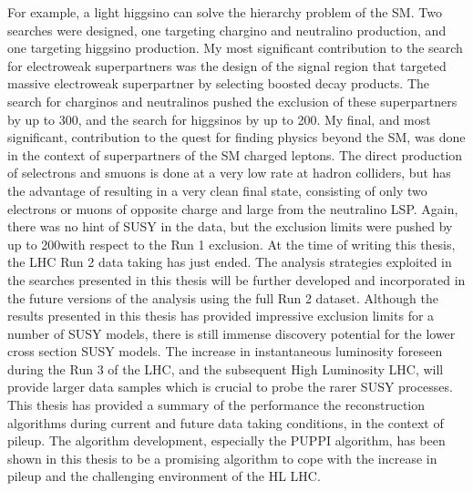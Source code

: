 For example, a light higgsino can solve the hierarchy problem of the SM. 
Two searches were designed, one targeting chargino and neutralino production, and one targeting higgsino production. 
My most significant contribution to the search for electroweak superpartners was the design of the signal region that targeted massive electroweak superpartner by selecting boosted decay products. 
The search for charginos and neutralinos pushed the exclusion of these superpartners by up to 300\GeV, and the search for higgsinos by up to 200\GeV. 
\newpara
\noindent\justify
My final, and most significant, contribution to the quest for finding physics beyond the SM, was done in the context of superpartners of the SM charged leptons. 
The direct production of selectrons and smuons is done at a very low rate at hadron colliders, but has the advantage of resulting in a very clean final state, consisting of only two electrons or muons of opposite charge and large \ptmiss from the neutralino LSP. 
Again, there was no hint of SUSY in the data, but the exclusion limits were pushed by up to 200\GeV with respect to the Run 1 exclusion.  
\newpara
\noindent\justify
At the time of writing this thesis, the LHC Run 2 data taking has just ended. 
The analysis strategies exploited in the searches presented in this thesis will be further developed and incorporated in the future versions of the analysis using the full Run 2 dataset.
Although the results presented in this thesis has provided impressive exclusion limits for a number of SUSY models, there is still immense discovery potential for the lower cross section SUSY models.
The increase in instantaneous luminosity foreseen during the Run 3 of the LHC, and the subsequent High Luminosity LHC, will provide larger data samples which is crucial to probe the rarer SUSY processes. 
This thesis has provided a summary of the performance the \ptmiss reconstruction algorithms during current and future data taking conditions, in the context of pileup.
The algorithm development, especially the PUPPI algorithm, has been shown in this thesis to be a promising algorithm to cope with the increase in pileup and the challenging environment of the HL LHC.
 
